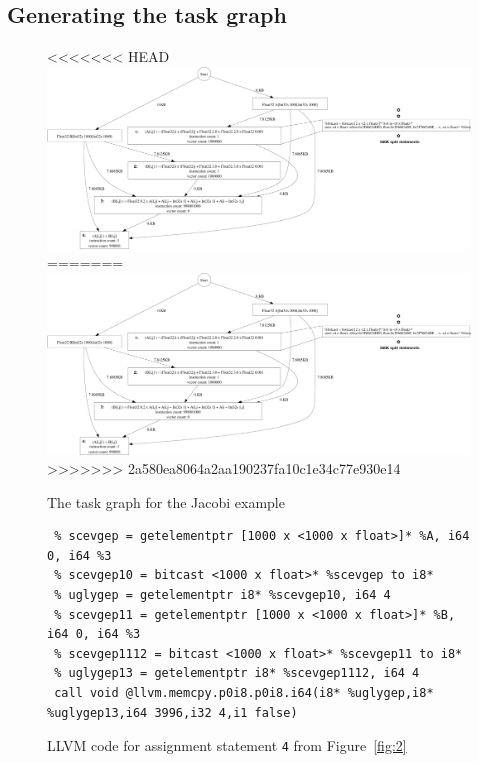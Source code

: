 \subsection{Generating the task graph}
\label{sec:build-appl-graph}

\begin{figure}[t!]
<<<<<<< HEAD
  \includegraphics[width=2*\columnwidth height=3in]{./figures/jacobi2d}
=======
  \includegraphics[scale=0.35]{./figures/jacobi2d}
>>>>>>> 2a580ea8064a2aa190237fa10c1e34c77e930e14
  \caption{The task graph for the Jacobi example}
  \label{fig:1}
\end{figure}

\begin{figure}[t!]
  \centering
\begin{verbatim}
 % scevgep = getelementptr [1000 x <1000 x float>]* %A, i64 0, i64 %3
 % scevgep10 = bitcast <1000 x float>* %scevgep to i8*
 % uglygep = getelementptr i8* %scevgep10, i64 4
 % scevgep11 = getelementptr [1000 x <1000 x float>]* %B, i64 0, i64 %3
 % scevgep1112 = bitcast <1000 x float>* %scevgep11 to i8*
 % uglygep13 = getelementptr i8* %scevgep1112, i64 4
 call void @llvm.memcpy.p0i8.p0i8.i64(i8* %uglygep,i8* %uglygep13,i64 3996,i32 4,i1 false)
\end{verbatim}
  \caption{LLVM code for assignment statement \texttt{4} from
    Figure~\ref{fig:2}}
  \label{fig:3}
\end{figure}

